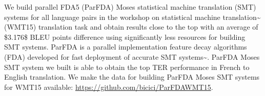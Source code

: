 We build parallel FDA5 (ParFDA) Moses statistical machine translation (SMT) systems for all language pairs in the workshop on statistical machine translation{\textasciitilde}\cite{WMT2015} (WMT15) translation task and obtain results close to the top with an average of \$3.176\$ BLEU points difference using significantly less resources for building SMT systems. ParFDA is a parallel implementation feature decay algorithms (FDA) developed for fast deployment of accurate SMT systems{\textasciitilde}\cite{Bicici:FDA4FDA:WMT13,Bicici:FDA54FDA:WMT14,BiciciYuret:FDA5:TASLP }. ParFDA Moses SMT system we built is able to obtain the top TER performance in French to English translation. We make the data for building ParFDA Moses SMT systems for WMT15 available: \url{https://github.com/bicici/ParFDAWMT15}.
